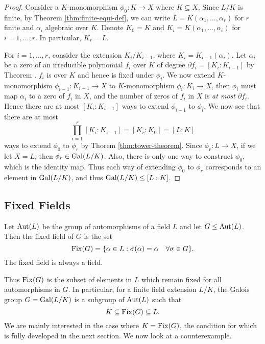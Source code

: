 \begin{proof}
    Consider a $K$-monomorphism $\phi_0 : K \to X$ where $K \subseteq X$. Since $L/K$ is finite, by Theorem \ref{thm:finite-equi-def}, we can write $L = K(\alpha_1, \ldots, \alpha_r)$ for $r$ finite and $\alpha_i$ algebraic over $K$. Denote $K_0 = K$ and
    $K_i = K(\alpha_1, \dots, \alpha_i)$ for $i = 1, \ldots, r$. In particular, $K_r = L$. 


    For $i = 1, \ldots, r$, consider the extension $K_i / K_{i-1}$, where $K_i = K_{i-1} (\alpha_i)$. Let $\alpha_i$ be a zero of an irreducible polynomial $f_i$ over $K$ of degree $\partial f_i = [K_i : K_{i-1}]$ by Theorem \TODO. $f_i$ is over $K$ and hence is fixed under $\phi_i$. We now extend $K$-monomorphism $\phi_{i-1} : K_{i-1} \to X$ to $K$-monomorphism $\phi_i: K_i \to X$, then $\phi_i$ must map $\alpha_i$ to a zero of $f_i$ in $X$, and the number of zeros of $f_i$ in $X$ is \textit{at most} $\partial f_i$. Hence there are at most $[K_i : K_{i-1}]$ ways to extend $\phi_{i-1}$ to $\phi_i$. We now see that there are at most $$\prod_{i=1} ^r [K_i : K_{i-1}] = [K_r : K_0] = [L : K]$$ ways to extend $\phi_0$ to $\phi_r$ by Thorem \ref{thm:tower-theorem}. Since $\phi_r : L \to X$, if we let $X = L$, then $\phi_r \in \operatorname{Gal}(L/K)$. Also, there is only one way to construct $\phi_0$, which is the identity map. Thus each way of extending $\phi_0$ to $\phi_r$ corresponds to an element in $\operatorname{Gal}(L/K)$, and thus $\operatorname{Gal}(L/K) \le [L:K]$. 
\end{proof}
\cite{galois-theory-lectures}


\subsection{Fixed Fields}

\begin{definition}
    Let $\operatorname{Aut}(L)$ be the group of automorphisms of a field $L$ and let $G \leq \operatorname{Aut}(L)$. Then the fixed field of $G$ is the set $$\operatorname{Fix}(G) = \{ \alpha \in L : \sigma(\alpha) = \alpha \quad \forall \sigma \in G \}. $$ The fixed field is always a field.
\end{definition}
Thus $\operatorname{Fix}(G)$ is the subset of elements in $L$ which remain fixed for all automorphisms in $G$. In particular, for a finite field extension $L/ K$, the Galois group $G = \operatorname{Gal}(L / K)$ is a subgroup of $\operatorname{Aut}(L)$ such that $$K \subseteq \operatorname{Fix}(G) \subseteq L. $$ We are mainly interested in the case where $K = \operatorname{Fix}(G)$, the condition for which is fully developed in the next section. We now look at a counterexample. 

